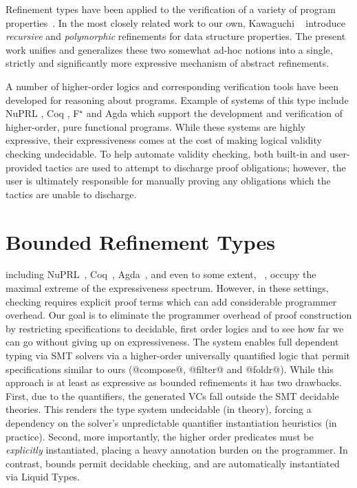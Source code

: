 Refinement types have been applied to the verification of a variety of
program properties~\cite{pfenningxi98,Dunfield,GordonTOPLAS2011,FournetCCS11}.
%
In the most closely related work to our own, Kawaguchi \etal~\cite{LiquidPLDI09} 
introduce \emph{recursive} and \emph{polymorphic} refinements for data
structure properties.
%
The present work unifies and generalizes these two somewhat ad-hoc notions 
into a single, strictly and significantly more expressive mechanism of
abstract refinements.

A number of higher-order logics and corresponding verification tools
have been developed for reasoning about programs.
%
Example of systems of this type include NuPRL \cite{Constable86},
Coq \cite{coq-book}, F$^\star$ \cite{SwamyCFSBY11} and Agda \cite{norell07}
which support the development and verification of higher-order, 
pure functional programs.
%
While these systems are highly expressive, their expressiveness comes at the
cost of making logical validity checking undecidable.
%
To help automate validity checking, both built-in and user-provided
tactics are used to attempt to discharge proof obligations; however,
the user is ultimately responsible for manually proving any
obligations which the tactics are unable to discharge.

\section{Bounded Refinement Types}\label{sec:abstractrefinements:related}

%
including
NuPRL~\citep{Constable86},
Coq~\citep{coq-book}, Agda~\citep{norell07},
and even to some extent, \haskell~\citep{JonesVWW06, McBride02},
occupy the maximal extreme of the expressiveness spectrum.
However, in these settings, checking requires explicit
proof terms which can add considerable programmer overhead.
%
Our goal is to eliminate the programmer overhead of
proof construction by restricting specifications to
decidable, first order logics and to see how far
we can go without giving up on expressiveness.
%
The \fstar system enables full dependent typing via
SMT solvers via a higher-order universally quantified
logic that permit specifications similar to ours
(\eg @compose@, @filter@ and @foldr@).
%
While this approach is at least as expressive
as bounded refinements it has two drawbacks.
%
First, due to the quantifiers, the generated VCs
fall outside the SMT decidable theories.
This renders the type system undecidable (in theory),
forcing a dependency on the solver's unpredictable
quantifier instantiation heuristics (in practice).
%
Second, more importantly, %
the higher order
predicates must be \emph{explicitly} instantiated,
placing a heavy annotation burden on the programmer.
%
In contrast, bounds permit decidable
checking, and are automatically instantiated
via Liquid Types.


